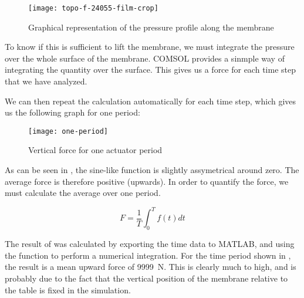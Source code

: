 \begin{figure}[h]
  \begin{center}
    \texttt{[image: topo-f-24055-film-crop]}
  \end{center}
  \caption{Graphical representation of the pressure profile along the membrane}
  \label{fig:pressure-profile}
\end{figure}


To know if this is sufficient to lift the membrane, we must integrate the
pressure over the whole surface of the membrane. COMSOL provides a sinmple way
of integrating the quantity over the surface. This gives us a force for each
time step that we have analyzed.

We can then repeat the calculation automatically for each time step, which gives
us the following graph for one period:

\begin{figure}[h]
  \begin{center}
    \texttt{[image: one-period]}
  \end{center}
  \caption{Vertical force for one actuator period}
  \label{fig:one-period}
\end{figure}

As can be seen in , the sine-like function is slightly
assymetrical around zero. The average force is therefore positive (upwards).
In order to quantify the force, we must calculate the average over one period. 

\begin{equation}
  F = \frac{1}{T} \int_{0}^{T} f(t) dt
  \label{eq:force}
\end{equation}

The result of  was calculated by exporting the time data to MATLAB,
and using the  function to perform a numerical integration. For the
time period shown in , the result is a mean upward force of
\SI{9999}{\newton}.  %
This is clearly much to high, and is probably due to the fact that the vertical
position of the membrane relative to the table is fixed in the simulation.


